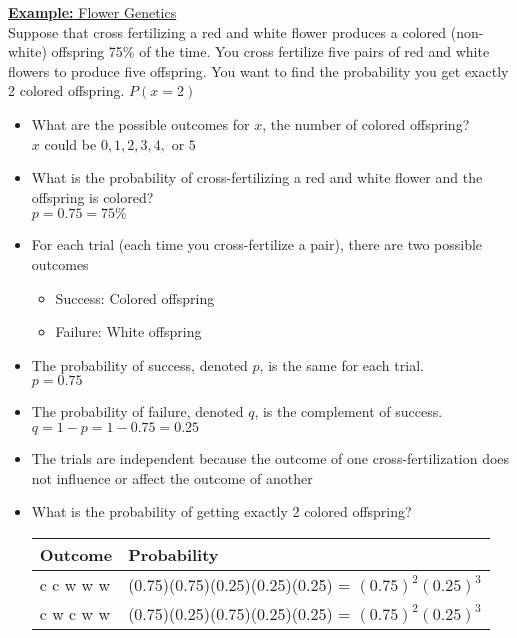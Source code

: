 \documentclass[a4paper]{article}
\let\bf\textbf
\begin{document}
\begin{shaded}
    \underline{\bf{Example:} Flower Genetics}
    \vspace{2mm}\\
    Suppose that cross fertilizing a red and white flower produces a colored (non-white) offspring 75\% of the time. You cross fertilize five pairs of red and white flowers to produce five offspring. You want to find the probability you get exactly 2 colored offspring. $P(x = 2)$
    \begin{itemize}
        \item What are the possible outcomes for $x$, the number of colored offspring?\\
        $x$ could be $0, 1, 2, 3, 4,$ or $5$
        \item What is the probability of cross-fertilizing a red and white flower and the offspring is colored?\\
        $p = 0.75 = 75\%$
        \item For each trial (each time you cross-fertilize a pair), there are two possible outcomes
        \begin{itemize}
            \item Success: Colored offspring
            \item Failure: White offspring
        \end{itemize}
        \item The probability of success, denoted $p$, is the same for each trial.\\
        $p = 0.75$
        \item The probability of failure, denoted $q$, is the complement of success.\\
        $q = 1 - p = 1 - 0.75 = 0.25$
        \item The trials are independent because the outcome of one cross-fertilization does not influence or affect the outcome of another
        \item What is the probability of getting exactly 2 colored offspring?\\
        \begin{tabularx}{0.7\textwidth}{ 
            | >{\hsize=0.25\hsize \centering\arraybackslash}X 
            | >{\hsize=0.75\hsize \centering\arraybackslash}X | }
            \hline
            Outcome & Probability \\
            \hline
            c c w w w & (0.75)(0.75)(0.25)(0.25)(0.25) = $(0.75)^2(0.25)^3$\\
            c w c w w & (0.75)(0.25)(0.75)(0.25)(0.25) = $(0.75)^2(0.25)^3$\\

\end{tabularx}
\end{itemize}
\end{shaded}
\end{document}
